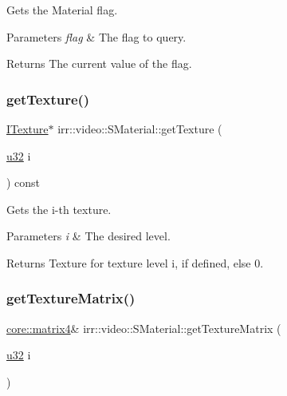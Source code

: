 Gets the Material flag. 


\begin{DoxyParams}{Parameters}
{\em flag} & The flag to query. \\
\hline
\end{DoxyParams}
\begin{DoxyReturn}{Returns}
The current value of the flag. 
\end{DoxyReturn}
\mbox{\label{classirr_1_1video_1_1SMaterial_ad5883da3db8087fbbb74f7bb23e82874}} 
\subsubsection{\texorpdfstring{get\+Texture()}{getTexture()}}
{\footnotesize\ttfamily \hyperlink{classirr_1_1video_1_1ITexture}{I\+Texture}$\ast$ irr\+::video\+::\+S\+Material\+::get\+Texture (\begin{DoxyParamCaption}\item[{\hyperlink{namespaceirr_a0416a53257075833e7002efd0a18e804}{u32}}]{i }\end{DoxyParamCaption}) const\hspace{0.3cm}{\ttfamily [inline]}}



Gets the i-\/th texture. 


\begin{DoxyParams}{Parameters}
{\em i} & The desired level. \\
\hline
\end{DoxyParams}
\begin{DoxyReturn}{Returns}
Texture for texture level i, if defined, else 0. 
\end{DoxyReturn}
\mbox{\label{classirr_1_1video_1_1SMaterial_a102aec38ea69a7c609edfad74b40463c}} 
\subsubsection{\texorpdfstring{get\+Texture\+Matrix()}{getTextureMatrix()}\hspace{0.1cm}{\footnotesize\ttfamily [1/2]}}
{\footnotesize\ttfamily \hyperlink{namespaceirr_1_1core_a73fa92e638c5ca97efd72da307cc9b65}{core\+::matrix4}\& irr\+::video\+::\+S\+Material\+::get\+Texture\+Matrix (\begin{DoxyParamCaption}\item[{\hyperlink{namespaceirr_a0416a53257075833e7002efd0a18e804}{u32}}]{i }\end{DoxyParamCaption})\hspace{0.3cm}{\ttfamily [inline]}}



